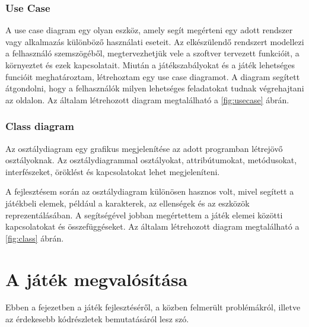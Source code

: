 \documentclass[12pt, a4paper]{report}
\theoremstyle{definition}
\begin{document}
	\subsection{Use Case}
	A use case diagram egy olyan eszköz, amely segít megérteni egy adott rendszer vagy alkalmazás különböző használati eseteit. Az elkészülendő rendszert modellezi a felhasználó szemszögéből, megtervezhetjük vele a szoftver tervezett funkcióit, a környeztet és ezek kapcsolatait. Miután a játékszabályokat és a játék lehetséges funcióit meghatároztam, létrehoztam egy use case diagramot. A diagram segített átgondolni, hogy a felhasználók milyen lehetséges feladatokat tudnak végrehajtani az oldalon. Az általam létrehozott diagram megtalálható a \ref{fig:usecase} ábrán.
		
	\subsection{Class diagram}
	Az osztálydiagram egy grafikus megjelenítése az adott programban létrejövő osztályoknak. Az osztálydiagrammal osztályokat, attribútumokat, metódusokat, interfészeket, öröklést és kapcsolatokat lehet megjeleníteni.

	A fejlesztésem során az osztálydiagram különösen hasznos volt, mivel segített a játékbeli elemek, például a karakterek, az ellenségek és az eszközök reprezentálásában. A segítségével jobban megértettem a játék elemei közötti kapcsolatokat és összefüggéseket. Az általam létrehozott diagram megtalálható a \ref{fig:class} ábrán.
	
	\chapter{A játék megvalósítása}
	Ebben a fejezetben a játék fejlesztéséről, a közben felmerült problémákról, illetve az
	érdekesebb kódrészletek bemutatásáról lesz szó.
	
\end{document}
